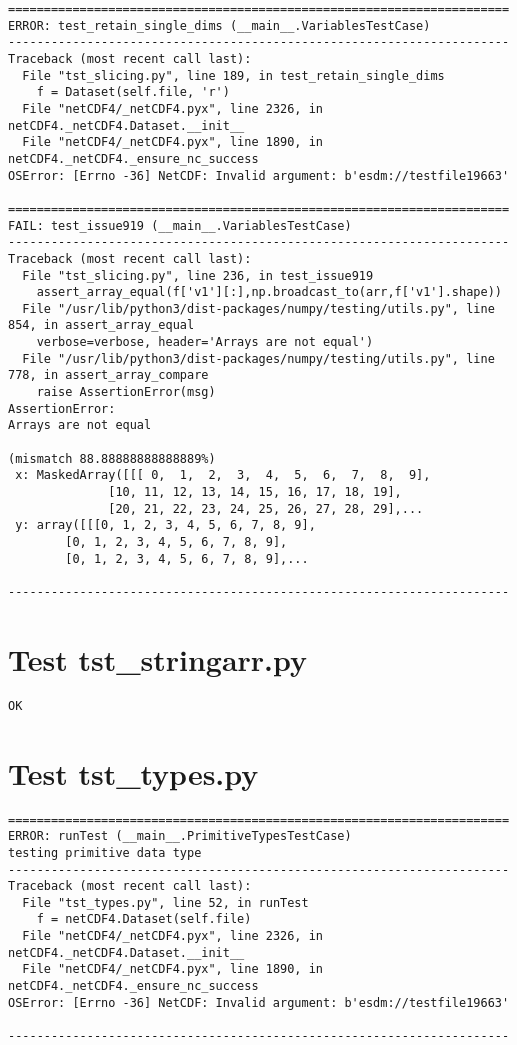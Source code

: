 \begin{verbatim}
======================================================================
ERROR: test_retain_single_dims (__main__.VariablesTestCase)
----------------------------------------------------------------------
Traceback (most recent call last):
  File "tst_slicing.py", line 189, in test_retain_single_dims
    f = Dataset(self.file, 'r')
  File "netCDF4/_netCDF4.pyx", line 2326, in netCDF4._netCDF4.Dataset.__init__
  File "netCDF4/_netCDF4.pyx", line 1890, in netCDF4._netCDF4._ensure_nc_success
OSError: [Errno -36] NetCDF: Invalid argument: b'esdm://testfile19663'

======================================================================
FAIL: test_issue919 (__main__.VariablesTestCase)
----------------------------------------------------------------------
Traceback (most recent call last):
  File "tst_slicing.py", line 236, in test_issue919
    assert_array_equal(f['v1'][:],np.broadcast_to(arr,f['v1'].shape))
  File "/usr/lib/python3/dist-packages/numpy/testing/utils.py", line 854, in assert_array_equal
    verbose=verbose, header='Arrays are not equal')
  File "/usr/lib/python3/dist-packages/numpy/testing/utils.py", line 778, in assert_array_compare
    raise AssertionError(msg)
AssertionError:
Arrays are not equal

(mismatch 88.88888888888889%)
 x: MaskedArray([[[ 0,  1,  2,  3,  4,  5,  6,  7,  8,  9],
              [10, 11, 12, 13, 14, 15, 16, 17, 18, 19],
              [20, 21, 22, 23, 24, 25, 26, 27, 28, 29],...
 y: array([[[0, 1, 2, 3, 4, 5, 6, 7, 8, 9],
        [0, 1, 2, 3, 4, 5, 6, 7, 8, 9],
        [0, 1, 2, 3, 4, 5, 6, 7, 8, 9],...

----------------------------------------------------------------------
\end{verbatim}

\section{Test tst\_stringarr.py}

\begin{verbatim}
OK
\end{verbatim}

\section{Test tst\_types.py}

\begin{verbatim}
======================================================================
ERROR: runTest (__main__.PrimitiveTypesTestCase)
testing primitive data type
----------------------------------------------------------------------
Traceback (most recent call last):
  File "tst_types.py", line 52, in runTest
    f = netCDF4.Dataset(self.file)
  File "netCDF4/_netCDF4.pyx", line 2326, in netCDF4._netCDF4.Dataset.__init__
  File "netCDF4/_netCDF4.pyx", line 1890, in netCDF4._netCDF4._ensure_nc_success
OSError: [Errno -36] NetCDF: Invalid argument: b'esdm://testfile19663'

----------------------------------------------------------------------
\end{verbatim}


